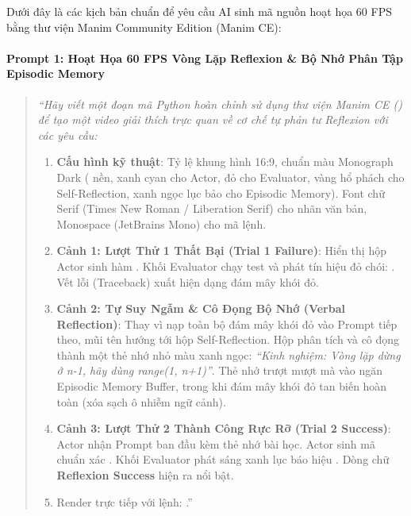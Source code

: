 \begin{simulationbox}
Dưới đây là các kịch bản chuẩn để yêu cầu AI sinh mã nguồn hoạt họa 60 FPS bằng thư viện Manim Community Edition (Manim CE):

\paragraph{Prompt 1: Hoạt Họa 60 FPS Vòng Lặp Reflexion \& Bộ Nhớ Phân Tập Episodic Memory}
\begin{quote}\small\itshape
``Hãy viết một đoạn mã Python hoàn chỉnh sử dụng thư viện Manim CE () để tạo một video giải thích trực quan về cơ chế tự phản tư Reflexion với các yêu cầu:
\begin{enumerate}
  \item \textbf{Cấu hình kỹ thuật}: Tỷ lệ khung hình 16:9, chuẩn màu Monograph Dark ( nền,  xanh cyan cho Actor,  đỏ cho Evaluator,  vàng hổ phách cho Self-Reflection,  xanh ngọc lục bảo cho Episodic Memory). Font chữ Serif (Times New Roman / Liberation Serif) cho nhãn văn bản, Monospace (JetBrains Mono) cho mã lệnh.
  \item \textbf{Cảnh 1: Lượt Thử 1 Thất Bại (Trial 1 Failure)}: Hiển thị hộp Actor sinh hàm . Khối Evaluator chạy test  và phát tín hiệu đỏ chói: . Vết lỗi (Traceback) xuất hiện dạng đám mây khói đỏ.
  \item \textbf{Cảnh 2: Tự Suy Ngẫm \& Cô Đọng Bộ Nhớ (Verbal Reflection)}: Thay vì nạp toàn bộ đám mây khói đỏ vào Prompt tiếp theo, mũi tên hướng tới hộp Self-Reflection. Hộp phân tích và cô đọng thành một thẻ nhớ nhỏ màu xanh ngọc: \textit{``Kinh nghiệm: Vòng lặp dừng ở n-1, hãy dùng range(1, n+1)''}. Thẻ nhớ trượt mượt mà vào ngăn Episodic Memory Buffer, trong khi đám mây khói đỏ tan biến hoàn toàn (xóa sạch ô nhiễm ngữ cảnh).
  \item \textbf{Cảnh 3: Lượt Thử 2 Thành Công Rực Rỡ (Trial 2 Success)}: Actor nhận Prompt ban đầu kèm thẻ nhớ bài học. Actor sinh mã chuẩn xác . Khối Evaluator phát sáng xanh lục báo hiệu . Dòng chữ \textbf{Reflexion Success} hiện ra nổi bật.
  \item Render trực tiếp với lệnh: .''
\end{enumerate}
\end{quote}


\end{simulationbox}
